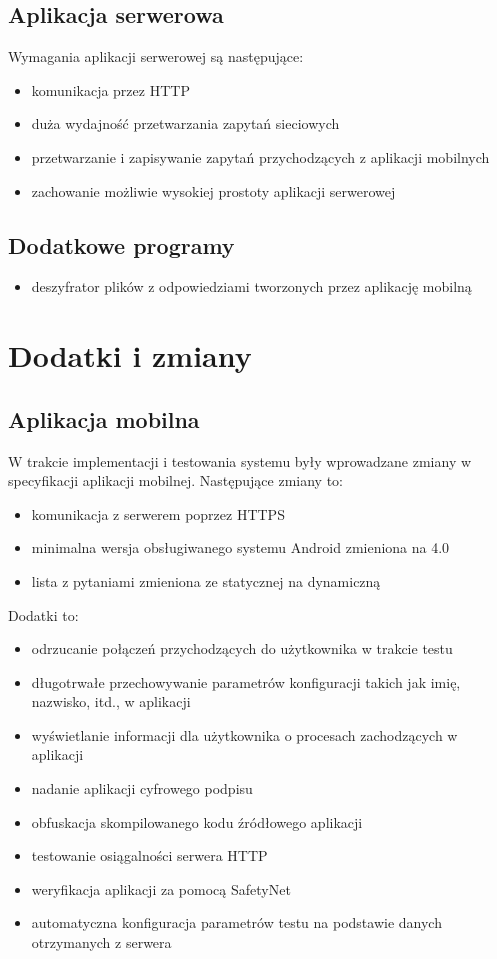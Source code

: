 \documentclass{report}
\begin{document}
			\subsection{Aplikacja serwerowa}
			Wymagania aplikacji serwerowej są następujące:
			\begin{itemize}
				\item komunikacja przez HTTP
				\item duża wydajność przetwarzania zapytań sieciowych
				\item przetwarzanie i zapisywanie zapytań przychodzących z aplikacji mobilnych
				\item zachowanie możliwie wysokiej prostoty aplikacji serwerowej
			\end{itemize}
		
			\subsection{Dodatkowe programy}
			\begin{itemize}
				\item deszyfrator plików z odpowiedziami tworzonych przez aplikację mobilną
			\end{itemize}
		
		\section{Dodatki i zmiany}
		
			\subsection{Aplikacja mobilna}
			W trakcie implementacji i testowania systemu były wprowadzane zmiany w specyfikacji aplikacji mobilnej. Następujące zmiany to:
			\begin{itemize}
				\item komunikacja z serwerem poprzez HTTPS
				\item minimalna wersja obsługiwanego systemu Android zmieniona na 4.0
				\item lista z pytaniami zmieniona ze statycznej na dynamiczną
			\end{itemize}
			Dodatki to:
			\begin{itemize}
				\item odrzucanie połączeń przychodzących do użytkownika w trakcie testu
				\item długotrwałe przechowywanie parametrów konfiguracji takich jak imię, nazwisko, itd., w aplikacji
				\item wyświetlanie informacji dla użytkownika o procesach zachodzących w aplikacji
				\item nadanie aplikacji cyfrowego podpisu
				\item obfuskacja skompilowanego kodu źródłowego aplikacji
				\item testowanie osiągalności serwera HTTP
				\item weryfikacja aplikacji za pomocą SafetyNet
				\item automatyczna konfiguracja parametrów testu na podstawie danych otrzymanych z serwera
			\end{itemize}
		
\end{document}
